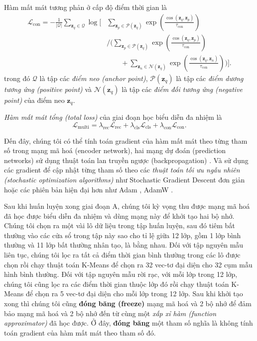 Hàm mất mát tương phản ở cấp độ điểm thời gian là
\begin{equation}
\begin{aligned}
\mathcal{L}_{\mathrm{con}}
=
-\frac{1}{|\mathcal{Q}|}
\sum_{\mathbf{z}_q\in\mathcal{Q}}
\log
\Bigg[
&
\sum_{\mathbf{z}_p\in\mathcal{P}(\mathbf{z}_q)}
\exp\left(
\frac{
\operatorname{cos}(\mathbf{z}_q,\mathbf{z}_p)
}{
\tau_{\mathrm{con}}
}
\right)
\\[-0.2em]
&\Bigg/
\Bigg(
\sum_{\mathbf{z}_p\in\mathcal{P}(\mathbf{z}_q)}
\exp\left(
\frac{
\operatorname{cos}(\mathbf{z}_q,\mathbf{z}_p)
}{
\tau_{\mathrm{con}}
}
\right)
\\
&\qquad
+
\sum_{\mathbf{z}_n\in\mathcal{N}(\mathbf{z}_q)}
\exp\left(
\frac{
\operatorname{cos}(\mathbf{z}_q,\mathbf{z}_n)
}{
\tau_{\mathrm{con}}
}
\right)
\Bigg)
\Bigg].
\end{aligned}
\end{equation}
trong đó \(\mathcal{Q}\) là tập các \textit{điểm neo (anchor point)}, \(\mathcal{P}(\mathbf{z}_q)\) là tập các \textit{điểm dương tương ứng (positive point)} và \(\mathcal{N}(\mathbf{z}_q)\) là tập các \textit{điểm đối tương ứng (negative point)} của điểm neo \(\mathbf{z}_q\).

\textit{Hàm mất mát tổng (total loss)} của giai đoạn học biểu diễn đa nhiệm là
\begin{equation}
\mathcal{L}_{\mathrm{multi}}
=
\lambda_{\mathrm{rec}}\mathcal{L}_{\mathrm{rec}}
+
\lambda_{\mathrm{cls}}\mathcal{L}_{\mathrm{cls}}
+
\lambda_{\mathrm{con}}\mathcal{L}_{\mathrm{con}}.
\end{equation}

Đến đây, chúng tôi có thể tính toán gradient của hàm mất mát theo từng tham số trong mạng mã hoá (encoder network), hai mạng dự đoán (prediction networks) sử dụng thuật toán lan truyền ngược (backpropagation) \cite{rumelhart1986learning}. Và sử dụng các gradient để cập nhật từng tham số theo các \textit{thuật toán tối ưu ngẫu nhiên (stochastic optimization algorithms)} như Stochastic Gradient Descent đơn giản \cite{4308316} hoặc các phiên bản hiện đại hơn như Adam \cite{kingma2015adam}, AdamW \cite{loshchilov2018decoupled}.

Sau khi huấn luyện xong giai đoạn A, chúng tôi kỳ vọng thu được mạng mã hoá đã học được biểu diễn đa nhiệm và dùng mạng này để khởi tạo hai bộ nhớ. Chúng tôi chọn ra một vài lô dữ liệu trong tập huấn luyện, sau đó tiêm bất thường vào các cửa sổ trong tập này sao cho tỉ lệ giữa 12 lớp, gồm 1 lớp bình thường và 11 lớp bất thường nhân tạo, là bằng nhau. Đối với tập nguyên mẫu liên tục, chúng tôi lọc ra tất cả điểm thời gian bình thường trong các lô được chọn rồi chạy thuật toán K-Means để chọn ra 32 vec-tơ đại diện cho 32 cụm mẫu hình bình thường. Đối với tập nguyên mẫu rời rạc, với mỗi lớp trong 12 lớp, chúng tôi cũng lọc ra các điểm thời gian thuộc lớp đó rồi chạy thuật toán K-Means để chọn ra 5 vec-tơ đại diện cho mỗi lớp trong 12 lớp. Sau khi khởi tạo xong thì chúng tôi cũng \textbf{đóng băng (freeze)} mạng mã hoá và 2 bộ nhớ để đảm bảo mạng mã hoá và 2 bộ nhớ đến từ cùng một \textit{xấp xỉ hàm (function approximator)} đã học được. Ở đây, \textbf{đóng băng} một tham số nghĩa là không tính toán gradient của hàm mất mát theo tham số đó.

